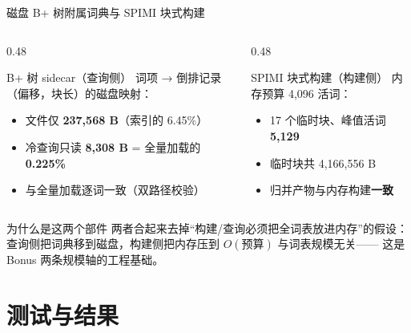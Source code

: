 \documentclass[UTF8,fontset=none,aspectratio=169,10pt]{ctexbeamer}
\newcommand{\key}[1]{\textcolor{accent}{\textbf{#1}}}
\newcommand{\src}[1]{\par\vspace{0.5em}{\fontsize{8}{9.6}\selectfont\color{gray}#1\par}}
\newcommand{\vsp}{\vspace*{\stretch{1}}}
\begin{document}
\begin{frame}{磁盘 B+ 树附属词典与 SPIMI 块式构建}
  \begin{columns}[T]
    \begin{column}{0.48\textwidth}
      \begin{block}{B+ 树 sidecar（查询侧）}
        \normalsize
        词项 → 倒排记录（偏移，块长）的磁盘映射：
        \begin{itemize}\setlength{\itemsep}{0.25em}
          \item 文件仅 \key{237,568 B}（索引的 6.45\%）
          \item 冷查询只读 \key{8,308 B} = 全量加载的 \key{0.225\%}
          \item 与全量加载逐词一致（双路径校验）
        \end{itemize}
      \end{block}
    \end{column}
    \begin{column}{0.48\textwidth}
      \begin{block}{SPIMI 块式构建（构建侧）}
        \normalsize
        内存预算 4,096 活词：
        \begin{itemize}\setlength{\itemsep}{0.25em}
          \item 17 个临时块、峰值活词 \key{5,129}
          \item 临时块共 4,166,556 B
          \item 归并产物与内存构建\key{一致}
        \end{itemize}
      \end{block}
    \end{column}
  \end{columns}
  \vsp
  \begin{block}{为什么是这两个部件}
    \normalsize
    两者合起来去掉``构建/查询必须把全词表放进内存''的假设：
    查询侧把词典移到磁盘，构建侧把内存压到 $O(\text{预算})$ 与词表规模无关——
    这是 Bonus 两条规模轴的工程基础。
  \end{block}
\end{frame}

\section{测试与结果}
\end{document}
